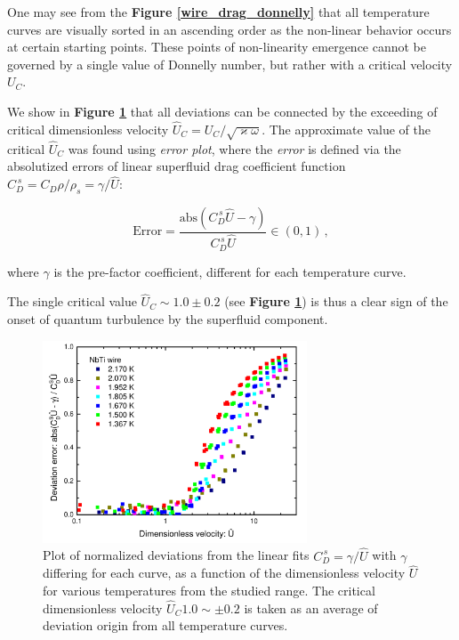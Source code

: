 One may see from the \textbf{Figure \ref{wire_drag_donnelly}} that all temperature curves are visually sorted in an ascending order as the non-linear behavior occurs at certain starting points. These points of non-linearity emergence cannot be governed by a single value of Donnelly number, but rather with a critical velocity $U_C$.

We show in \textbf{Figure \ref{wire_nonlinear_drag}} that all deviations can be connected by the exceeding of critical dimensionless velocity $\hat{U}_C = U_C / \sqrt{\varkappa \omega}$. The approximate value of the critical $\hat{U}_C$ was found using \textit{error plot}, where the \textit{error} is defined via the absolutized errors of linear superfluid drag coefficient function $C_D^{\, s} = C_D \rho / \rho_s = \gamma / \hat{U}$:

\begin{equation}
\text{Error} = \frac{\text{abs}(C_D^{\,s} \hat{U} - \gamma)}{C_D^{\,s} \hat{U}} \in (0,1)\,,
\end{equation}

where $\gamma$ is the pre-factor coefficient, different for each temperature curve.

The single critical value $\hat{U}_C \sim 1.0 \pm 0.2$ (see \textbf{Figure \ref{wire_nonlinear_drag}}) is thus a clear sign of the onset of quantum turbulence by the superfluid component.

\begin{figure}[h]
	\centering
	\includegraphics[width=0.7\textwidth]{graphics/results/wire_nonlinear_drag}
	\caption{Plot of normalized deviations from the linear fits $C_D^{\,s} =  \gamma / \hat{U}$ with $\gamma$ differing for each curve, as a function of the dimensionless velocity $\hat{U}$ for various temperatures from the studied range. The critical dimensionless velocity $\hat{U}_C 1.0 \sim \pm 0.2$ is taken as an average of deviation origin from all temperature curves.}
	\label{wire_nonlinear_drag}
\end{figure}


